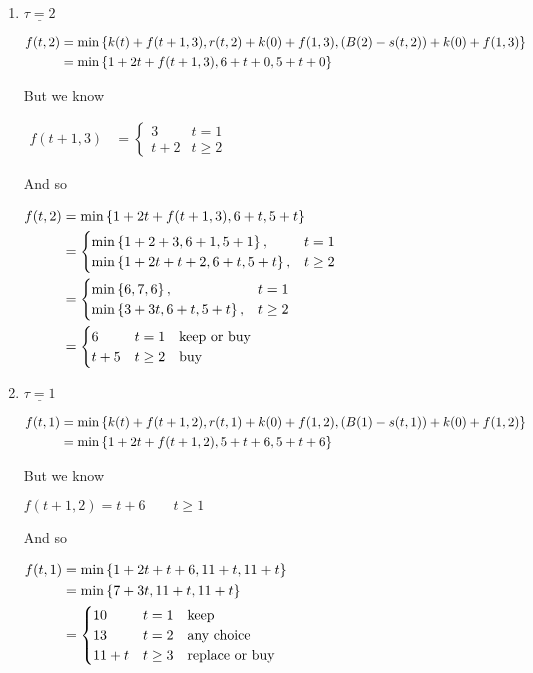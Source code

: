\begin{prob}
\begin{enumerate}[label = {\textbf{(\greek*)}}]
\begin{sol}
\begin{enumerate}
\item $\underline{\tau=2}$ 

$\begin{aligned}
f(t,2) &= \min\left\{k(t)+f(t+1,3),r(t,2)+k(0)+f(1,3),\left(B(2)-s(t,2)\right)+k(0)+f(1,3)\right\}\\
&= \min\left\{1+2t+f(t+1,3),6+t+0,5+t+0\right\} 
\end{aligned}$

But we know

$\begin{aligned}
f(t+1,3)&=\begin{cases}
3 & t=1 \\
t+2 & t\geq2 
\end{cases}
\end{aligned}$

And so

$\begin{aligned}
f(t,2) &= \min\left\{1+2t+f(t+1,3),6+t,5+t\right\} \\
&= \begin{cases}
\min\left\{1+2+3,6+1,5+1\right\}, & t=1\\
\min\left\{1+2t+t+2,6+t,5+t\right\}, & t\geq2\\
\end{cases}\\
&= \begin{cases}
\min\left\{6,7,6\right\}, & t=1\\
\min\left\{3+3t,6+t,5+t\right\}, & t\geq2\\
\end{cases}\\
&= \begin{cases}
6 & t=1 \quad \text{keep or buy}\\
t+5 & t\geq2 \quad \text{buy}
\end{cases}
\end{aligned}$

\item $\underline{\tau=1}$ 

$\begin{aligned}
f(t,1) &= \min\left\{k(t)+f(t+1,2),r(t,1)+k(0)+f(1,2),\left(B(1)-s(t,1)\right)+k(0)+f(1,2)\right\}\\
&= \min\left\{1+2t+f(t+1,2),5+t+6,5+t+6\right\} 
\end{aligned}$

But we know

$f(t+1,2)= t+6 \qquad t\geq1$

And so

$\begin{aligned}
f(t,1) &= \min\left\{1+2t+t+6,11+t,11+t\right\} \\
 &= \min\left\{7+3t,11+t,11+t\right\} \\
 &=\begin{cases}
 10 & t=1 \quad \text{keep}\\
 13 & t=2 \quad \text{any choice}\\
 11+t & t\geq3 \quad \text{replace or buy}
 \end{cases}
\end{aligned}$


\end{enumerate}
\end{sol}
\end{enumerate}
\end{prob}
